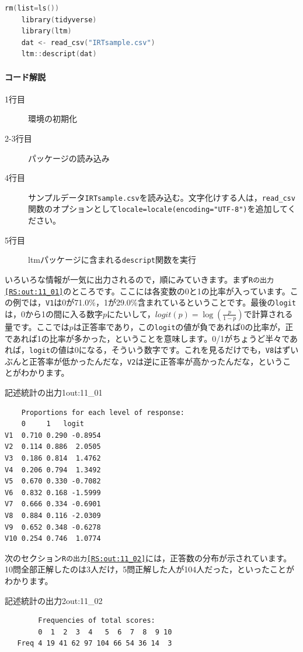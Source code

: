 \documentclass{ltjsbook}
\begin{document}
\begin{lstlisting}[language=c++,label={code:11_01},caption={データの読み込みから記述統計量の計算まで}]
    rm(list=ls())
    library(tidyverse)
    library(ltm)
    dat <- read_csv("IRTsample.csv")
    ltm::descript(dat)
\end{lstlisting}

\paragraph{コード解説}
\begin{description}
	\item[1行目] 環境の初期化
	\item[2-3行目] パッケージの読み込み
	\item[4行目] サンプルデータ\texttt{IRTsample.csv}を読み込む。文字化けする人は，\verb|read_csv|関数のオプションとして\texttt{locale=locale(encoding="UTF-8")}を追加してください。
	\item[5行目] ltmパッケージに含まれる\texttt{descript}関数を実行
\end{description}

いろいろな情報が一気に出力されるので，順にみていきます。まず\texttt{Rの出力\ref{RS:out:11_01}}のところです。ここには各変数の0と1の比率が入っています。この例では，\texttt{V1}は0が71.0\%，1が29.0\%含まれているということです。最後の\texttt{logit}は，0から1の間に入る数字$p$にたいして，$logit(p)=\log\left(\frac{p}{1-p}\right)$で計算される量です。ここでは$p$は正答率であり，この\texttt{logit}の値が負であれば0の比率が，正であれば1の比率が多かった，ということを意味します。0/1がちょうど半々であれば，\texttt{logit}の値は0になる，そういう数字です。これを見るだけでも，\texttt{V8}はずいぶんと正答率が低かったんだな，\texttt{V2}は逆に正答率が高かったんだな，ということがわかります。
\begin{Rscreen}{記述統計の出力1}{out:11_01}
	\begin{verbatim}
    Proportions for each level of response:
    0     1   logit
V1  0.710 0.290 -0.8954
V2  0.114 0.886  2.0505
V3  0.186 0.814  1.4762
V4  0.206 0.794  1.3492
V5  0.670 0.330 -0.7082
V6  0.832 0.168 -1.5999
V7  0.666 0.334 -0.6901
V8  0.884 0.116 -2.0309
V9  0.652 0.348 -0.6278
V10 0.254 0.746  1.0774
\end{verbatim}
\end{Rscreen}

次のセクション\texttt{Rの出力\ref{RS:out:11_02}}には，正答数の分布が示されています。10問全部正解したのは3人だけ，5問正解した人が104人だった，といったことがわかります。
\begin{Rscreen}{記述統計の出力2}{out:11_02}
	\begin{verbatim}
        Frequencies of total scores:
        0  1  2  3  4   5  6  7  8  9 10
   Freq 4 19 41 62 97 104 66 54 36 14  3
    \end{verbatim}
\end{Rscreen}
\end{document}
